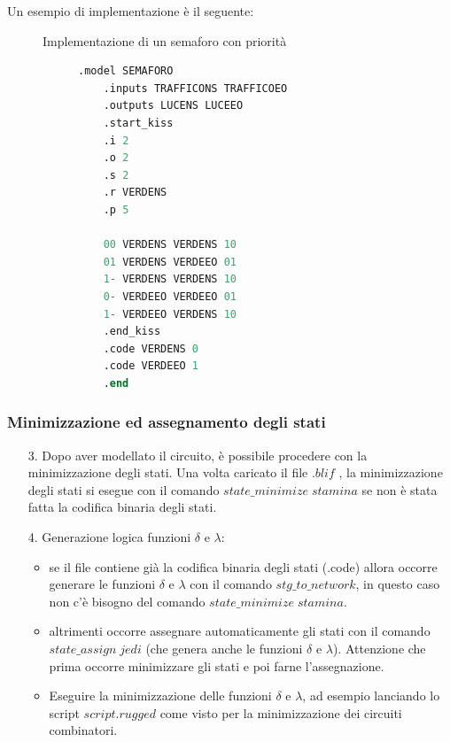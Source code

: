 \documentclass[a4paper]{article}
\theoremstyle{break}
\theoremstyle{break}
\theoremstyle{break}
\theoremstyle{break}
\begin{document}
Un esempio di implementazione è il seguente:

\begin{figure}[H]
  \begin{example}
    Implementazione di un semaforo con priorità
    \begin{figure}[H]
  \begin{lstlisting}[language=Verilog]
    .model SEMAFORO
    .inputs TRAFFICONS TRAFFICOEO
    .outputs LUCENS LUCEEO
    .start_kiss
    .i 2
    .o 2
    .s 2
    .r VERDENS
    .p 5

    00 VERDENS VERDENS 10
    01 VERDENS VERDEEO 01
    1- VERDENS VERDENS 10
    0- VERDEEO VERDEEO 01
    1- VERDEEO VERDENS 10
    .end_kiss
    .code VERDENS 0
    .code VERDEEO 1
    .end
  \end{lstlisting}
\end{figure}
  \end{example}
\end{figure}

\subsubsection{Minimizzazione ed assegnamento degli stati}
\begin{enumerate}
  \item[3.] Dopo aver modellato il circuito, è possibile procedere con la
  minimizzazione degli stati. Una volta caricato il file \( .blif \) , la
  minimizzazione degli stati si esegue con il comando \( state\_minimize\;stamina \) se
  non è stata fatta la codifica binaria degli stati.
\item [4.] Generazione logica funzioni \( \delta \) e \( \lambda \):
  \begin{itemize}
    \item se il file contiene già la codifica binaria degli stati (.code) allora
    occorre generare le funzioni \( \delta \) e \( \lambda \)  con il comando \( stg\_to\_network \),
    in questo caso non c'è bisogno del comando \( state\_minimize\;stamina \).
    \item altrimenti occorre assegnare automaticamente gli stati con il comando
    \( state\_assign\;jedi \) (che genera anche le funzioni \( \delta \)  e \( \lambda \)).
    Attenzione che prima occorre minimizzare gli stati e poi farne l’assegnazione.
    \item Eseguire la minimizzazione delle funzioni \( \delta \) e \( \lambda \), ad esempio lanciando
    lo script \(script.rugged\) come visto per la minimizzazione dei circuiti
    combinatori.
  \end{itemize}

\end{enumerate}
\end{document}
